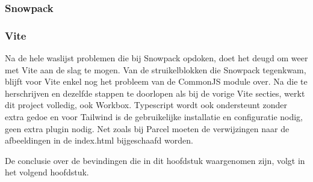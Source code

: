 \subsubsection{Snowpack}


\subsubsection{Vite}
Na de hele waslijst problemen die bij Snowpack opdoken, doet het deugd om weer met Vite aan de slag te mogen. Van de struikelblokken die Snowpack tegenkwam, blijft voor Vite enkel nog het probleem van de CommonJS module over. Na die te herschrijven en dezelfde stappen te doorlopen als bij de vorige Vite secties, werkt dit project volledig, ook Workbox. Typescript wordt ook ondersteunt zonder extra gedoe en voor Tailwind is de gebruikelijke installatie en configuratie nodig, geen extra plugin nodig. Net zoals bij Parcel moeten de verwijzingen naar de afbeeldingen in de index.html bijgeschaafd worden. 


De conclusie over de bevindingen die in dit hoofdstuk waargenomen zijn, volgt in het volgend hoofdstuk. 

